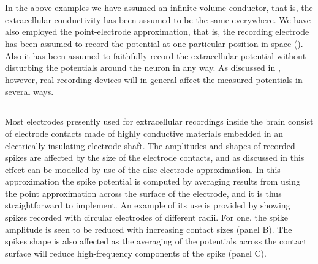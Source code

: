 \section{}

In the above examples we have assumed an infinite volume conductor, that is, the extracellular conductivity
has been assumed to be the same everywhere. We have also employed
the point-electrode approximation, that is, the recording electrode has been assumed  
to record the potential at one particular position in space (). Also it has been assumed
to faithfully record the extracellular potential without disturbing the potentials around the neuron
in any way.  As discussed in , however, real recording devices will in general affect
the measured potentials in several ways.  

\subsection{}
\label{sec:Spikes:electrode_size}
Most electrodes presently used for extracellular recordings inside the brain consist of electrode contacts made of
highly conductive materials embedded in an electrically insulating electrode shaft. The amplitudes and shapes of 
recorded spikes are affected by the size of the electrode contacts, and as discussed in 
this effect can be modelled by use of the disc-electrode approximation. In this approximation the spike potential is computed
by averaging results from using the point approximation across the surface of the electrode, and it is thus straightforward to implement.
 An example of its use
is provided by  showing spikes recorded with circular electrodes of different radii.
For one, the spike amplitude is seen to be reduced with increasing contact sizes (panel B). The spikes shape is also affected as the 
averaging of the potentials across the contact surface will reduce high-frequency components of the spike (panel C).

